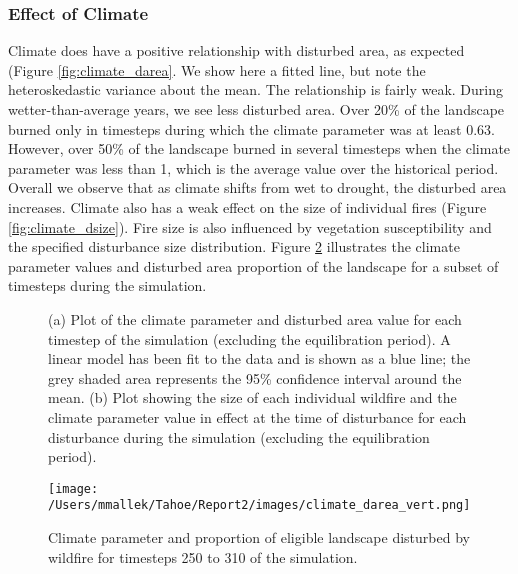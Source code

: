 \subsubsection{Effect of Climate} Climate does have a positive relationship with disturbed area, as expected (Figure \ref{fig:climate_darea}. We show here a fitted line, but note the heteroskedastic variance about the mean. The relationship is fairly weak. During wetter-than-average years, we see less disturbed area. Over 20\% of the landscape burned only in timesteps during which the climate parameter was at least 0.63. However, over 50\% of the landscape burned in several timesteps when the climate parameter was less than 1, which is the average value over the historical period. Overall we observe that as climate shifts from wet to drought, the disturbed area increases. Climate also has a weak effect on the size of individual fires (Figure \ref{fig:climate_dsize}). Fire size is also influenced by vegetation susceptibility and the specified disturbance size distribution. Figure \ref{fig:compare_clim_darea} illustrates the climate parameter values and disturbed area proportion of the landscape for a subset of timesteps during the simulation.
\begin{figure}[!htbp]
  \centering
  \caption{(a) Plot of the climate parameter and disturbed area value for each timestep of the simulation (excluding the  equilibration period). A linear model has been fit to the data and is shown as a blue line; the grey shaded area represents  the 95\% confidence interval around the mean. (b) Plot showing the size of each individual wildfire and the climate parameter value in effect at the time of disturbance for each disturbance during the simulation (excluding the equilibration period).}
  \label{fig:climate_disturbance}
\end{figure}

\begin{figure}[!htbp]
\centering
\texttt{[image: /Users/mmallek/Tahoe/Report2/images/climate\_darea\_vert.png]}
\caption{Climate parameter and proportion of eligible landscape disturbed by wildfire for timesteps 250 to 310 of the simulation.}
\label{fig:compare_clim_darea}
\end{figure}


